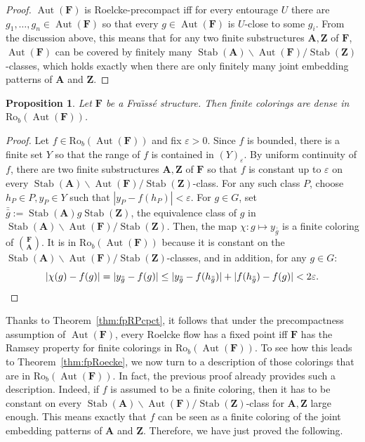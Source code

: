 \documentclass[11pt]{article}
\newtheorem{prop}[theo]{Proposition}
\theoremstyle{definition}
\numberwithin{equation}{section}
\numberwithin{figure}{section}
\numberwithin{table}{section}
\newcommand*{\mA}{\mathbf{A}}
\newcommand*{\mF}{\mathbf{F}}
\newcommand*{\mZ}{\mathbf{Z}}
\newcommand{\e}{\varepsilon}
\DeclareMathOperator{\Aut}{Aut}
\DeclareMathOperator{\Stab}{Stab}
\newcommand{\ROB}{\mathrm{Ro}_{b}}
\begin{document}
\begin{proof}
$\Aut(\mF)$ is Roelcke-precompact iff for every entourage $U$ there are\linebreak $g_{1},\ldots,g_{n}\in \Aut(\mF)$ so that every $g\in \Aut(\mF)$ is $U$-close to some $g_{i}$. From the discussion above, this means that for any two finite substructures $\mA, \mZ$ of $\mF$, $\Aut(\mF)$ can be covered by finitely many $\Stab(\mA)\backslash \Aut(\mF)/\Stab(\mZ)$-classes, which holds exactly when there are only finitely many joint embedding patterns of $\mA$ and $\mZ$.
\end{proof}

\begin{prop}
Let $\mF$ be a Fra\"{\i}ss\'e structure. Then finite colorings are dense in $\ROB(\Aut(\mF))$.
\end{prop}

\begin{proof}
Let $f\in \ROB(\Aut(\mF))$ and fix $\e>0$. Since $f$ is bounded, there is a finite set $Y$ so that the range of $f$ is contained in $(Y)_\e$. By uniform continuity of $f$, there are two finite substructures $\mA, \mZ$ of $\mF$ so that $f$ is constant up to $\e$ on every $\Stab(\mA)\backslash \Aut(\mF)/\Stab(\mZ)$-class. For any such class $P$, choose $ h_P\in P, y_P \in Y$ such that $|y_P - f(h_P)|<\e$. For $g\in G$, set $\bar{\bar g}:= \Stab(\mA)g\Stab(\mZ)$, the equivalence class of $g$ in $\Stab(\mA)\backslash
\Aut(\mF)/\Stab(\mZ)$. Then, the map $\chi : g\mapsto y_{\bar{\bar g}}$ is a finite coloring of $\binom{\mF}{\mA}$. It is in $\ROB(\Aut(\mF))$ because it is constant on the $\Stab(\mA)\backslash \Aut(\mF)/\Stab(\mZ)$-classes, and in addition, for any $g\in G$:
\begin{equation*}
|\chi(g)-f(g)|=|y_{\bar{\bar g}} - f(g)|\leq |y_{\bar{\bar g}}-f(h_{\bar{\bar g}})|+ |f(h_{\bar{\bar g}})-f(g)|<2\e.
\qedhere
\end{equation*}
\end{proof}

Thanks to Theorem~\ref{thm:fpRPcpct}, it follows that under the precompactness assumption of $\Aut(\mF)$, every Roelcke flow has a fixed point iff $\mF$ has the Ramsey property for finite colorings in $\ROB(\Aut(\mF))$. To see how this leads to Theorem~\ref{thm:fpRoecke}, we now turn to a description of those colorings that are in $\ROB(\Aut(\mF))$. In fact, the previous proof already provides such a description. Indeed, if $f$ is assumed to be a finite coloring, then it has to be constant on every $\Stab(\mA)\backslash \Aut(\mF)/\Stab(\mZ)$-class for $\mA, \mZ$ large enough. This means exactly that $f$ can be seen as a finite coloring of the joint embedding patterns of $\mA$ and $\mZ$. Therefore, we have just proved the following.
\end{document}
